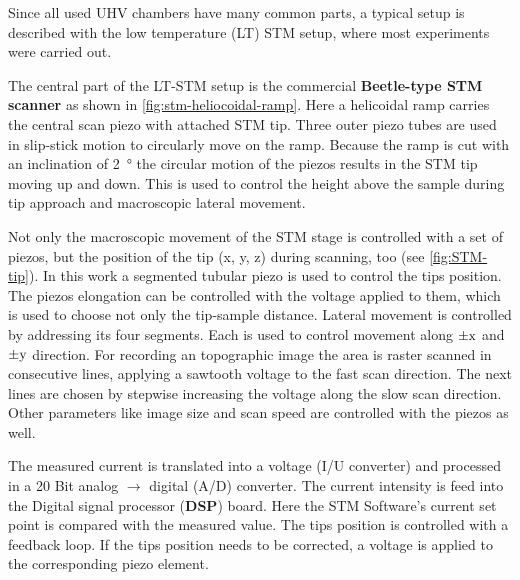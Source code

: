 Since all used UHV chambers have many common parts, a typical setup is described with the low temperature (LT) STM setup, where most experiments were carried out.

The central part of the LT-STM setup is the commercial \textbf{Beetle-type STM scanner} \cite{zoephel_aufbau_2000} as shown in \autoref{fig:stm-heliocoidal-ramp}. Here a helicoidal ramp carries the central scan piezo with attached STM tip. Three outer piezo tubes are used in slip-stick motion to circularly move on the ramp. Because the ramp is cut with an inclination of \SI{2}{\degree} the circular motion of the piezos results in the STM tip moving up and down. This is used to control the height above the sample during tip approach and macroscopic lateral movement.


Not only the macroscopic movement of the STM stage is controlled with a set of piezos, but the position of the tip (x, y, z) during scanning, too (see \autoref{fig:STM-tip}). In this work a segmented tubular piezo is used to control the tips position. The piezos elongation can be controlled with the voltage applied to them, which is used to choose not only the tip-sample distance. Lateral movement is controlled by addressing its four segments. Each is used to control movement along $\pm \textnormal{x}$ and $\pm \textnormal{y}$ direction. %
For recording an topographic image the area is raster scanned in consecutive lines, applying a sawtooth voltage to the fast scan direction. The next lines are chosen by stepwise increasing the voltage along the slow scan direction. Other parameters like image size and scan speed are controlled with the piezos as well.

The measured current is translated into a voltage (I/U converter) and processed in a 20 Bit analog $\rightarrow$ digital (A/D) converter. The current intensity is feed into the Digital signal processor (\textbf{DSP}) board. Here the STM Software's current set point is compared with the measured value. The tips position is controlled with a feedback loop. If the tips position needs to be corrected, a voltage is applied to the corresponding piezo element. 

